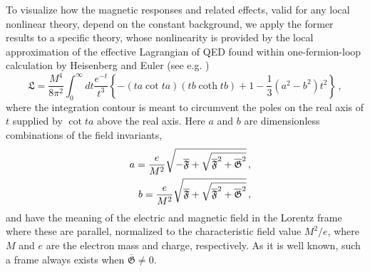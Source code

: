 \documentclass[12pt]{article}
\begin{document}
To visualize how the magnetic responses and related effects, valid for any
local nonlinear theory, depend on the constant background, we apply the
former results to a specific theory, whose nonlinearity is provided by the
local approximation of the effective Lagrangian of QED found within
one-fermion-loop calculation by Heisenberg and Euler \cite{Heisenberg} (see
e.g. \cite{BerLifPit}) 
\begin{equation}
\mathfrak{L}=\frac{M^{4}}{8\pi ^{2}}\int_{0}^{\infty }dt\frac{e^{-t}}{t^{3}}%
\left\{ -\left( ta\cot ta\right) \left( tb\coth tb\right) +1-\frac{1}{3}%
\left( a^{2}-b^{2}\right) t^{2}\right\} \,,  \label{eh1}
\end{equation}%
where the integration contour is meant to circumvent the poles on the real
axis of $t$ supplied by $\cot ta$ above the real axis. Here $a$ and $b$ are
dimensionless combinations of the field invariants,%
\begin{eqnarray}
&&a=\frac{e}{M^{2}}\sqrt{-\overline{\mathfrak{F}}+\sqrt{\overline{\mathfrak{F%
}}^{2}+\overline{\mathfrak{G}}^{2}}}\,,  \notag \\
&&b=\frac{e}{M^{2}}\sqrt{\overline{\mathfrak{F}}+\sqrt{\overline{\mathfrak{F}%
}^{2}+\overline{\mathfrak{G}}^{2}}}\,,  \label{eh2}
\end{eqnarray}%
and have the meaning of the electric and magnetic field in the Lorentz frame
where these are parallel, normalized to the characteristic field value $%
M^{2}/e$, where $M$ and $e$ are the electron mass and charge, respectively.
As it is well known, such a frame always exists when $\overline{\mathfrak{G}}%
\neq 0$.
\end{document}
